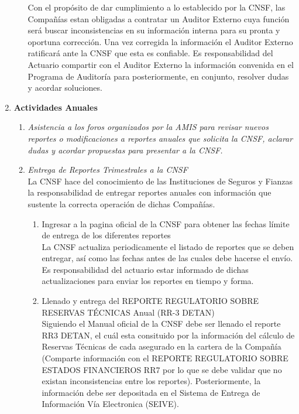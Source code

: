 \documentclass[11pt,twoside,openright,spanish]{report}
\numberwithin{equation}{chapter}
\numberwithin{figure}{chapter}
\numberwithin{table}{chapter}
\begin{document}
\begin{singlespace}
\begin{enumerate}
\begin{enumerate}
			Con el propósito de dar cumplimiento a lo establecido por la CNSF, las Compañías estan obligadas a contratar un Auditor Externo cuya función será buscar inconsistencias en su información interna para su pronta y oportuna corrección. Una vez corregida la información el Auditor Externo ratificará ante la CNSF que esta es confiable. Es responsabilidad del Actuario compartir con el Auditor Externo la información convenida en el Programa de Auditoría para posteriormente, en conjunto, resolver dudas y acordar soluciones. 
		\end{enumerate}
		\item \textbf{Actividades Anuales}
		\begin{enumerate}
			\item \textit{Asistencia a los foros organizados por la AMIS para revisar nuevos reportes o modificaciones a reportes anuales que solicita la CNSF, aclarar dudas y acordar propuestas para presentar a la CNSF.} \\ \-\hspace{0.5cm}
			\item \textit{Entrega de Reportes Trimestrales a la CNSF} \\ \-\hspace{0.5cm}
			La CNSF hace del conocimiento de las Instituciones de Seguros y Fianzas la responsabilidad de entregar reportes anuales con información que sustente la correcta operación de dichas Compañías.
			\begin{enumerate}
				\item {Ingresar a la pagina oficial de la CNSF para obtener las fechas límite de entrega de los diferentes reportes} \\ \-\hspace{0.5cm}
				La CNSF actualiza periodicamente el listado de reportes que se deben entregar, así como las fechas antes de las cuales debe hacerse el envío. Es responsabilidad del actuario estar informado de dichas actualizaciones para enviar los reportes en tiempo y forma.
				\item {Llenado y entrega del REPORTE REGULATORIO SOBRE RESERVAS TÉCNICAS Anual (RR-3 DETAN)} \\ \-\hspace{0.5cm}
				Siguiendo el Manual oficial de la CNSF debe ser llenado el reporte RR3 DETAN, el cuál esta consituido por la información del cálculo de Reservas Técnicas de cada asegurado en la cartera de la Compañía (Comparte información con el REPORTE REGULATORIO SOBRE ESTADOS FINANCIEROS RR7 por lo que se debe validar que no existan inconsistencias entre los reportes). Posteriormente, la información debe ser depositada en el Sistema de Entrega de Información Vía Electronica (SEIVE).

\end{enumerate}
\end{enumerate}
\end{enumerate}
\end{singlespace}
\end{document}
